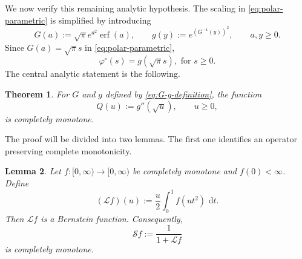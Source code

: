 \documentclass[11pt]{article}
\newtheorem{theorem}{Theorem}[section]
\newtheorem{lemma}[theorem]{Lemma}
\theoremstyle{definition}
\theoremstyle{remark}
\newcommand{\dd}{\,\mathrm d}
\newcommand{\erf}{\operatorname{erf}}
\begin{document}
We now verify this remaining analytic hypothesis.  The
scaling in \eqref{eq:polar-parametric} is simplified by introducing
\begin{equation}\label{eq:G-g-definition}
 G(a):=\sqrt\pi e^{a^2}\erf(a),
 \qquad g(y):=e^{(G^{-1}(y))^2},
 \qquad a,y\geq0.
\end{equation}
Since $G(a)=\sqrt\pi s$ in \eqref{eq:polar-parametric},
\begin{equation}\label{eq:polar-g-scaling}
 \varphi^\circ(s)=g(\sqrt\pi s), \mbox{ for }  s\ge0.
\end{equation}
The central analytic statement is the following.

\begin{theorem}\label{thm:complete-monotonicity}
For $G$ and $g$ defined by \eqref{eq:G-g-definition}, the function
\begin{equation}\label{eq:Q-definition}
 Q(u):=g''(\sqrt u),\qquad u\geq0,
\end{equation}
is completely monotone.
\end{theorem}

The proof will be divided into two lemmas.  The first one identifies an
operator preserving complete monotonicity.

\begin{lemma}\label{lem:L-preserves-Bernstein}
Let $f:[0,\infty)\to[0,\infty)$ be completely monotone and
$f(0)<\infty$.  Define
\begin{equation}\label{eq:L-operator}
 (\mathcal Lf)(u):=\frac u2\int_0^1 f(ut^2)\,\dd t.
\end{equation}
Then $\mathcal Lf$ is a Bernstein function.  Consequently,
\begin{equation}\label{eq:S-operator}
 \mathcal Sf:=\frac1{1+\mathcal Lf}
\end{equation}
is completely monotone.
\end{lemma}
\end{document}
